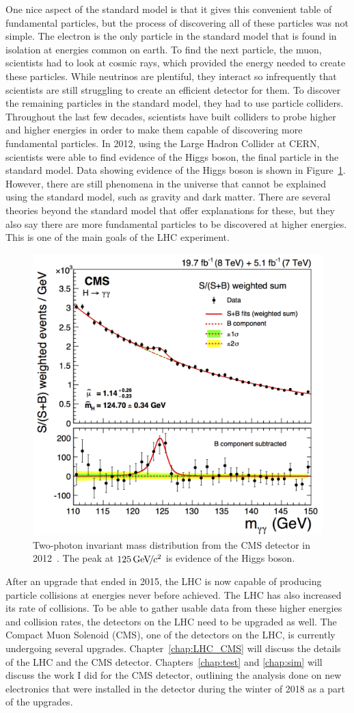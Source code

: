 One nice aspect of the standard model is that it gives this convenient table of fundamental particles, but the process of discovering all of these particles was not simple. The electron is the only particle in the standard model that is found in isolation at energies common on earth. To find the next particle, the muon, scientists had to look at cosmic rays, which provided the energy needed to create these particles. While neutrinos are plentiful, they interact so infrequently that scientists are still struggling to create an efficient detector for them. To discover the remaining particles in the standard model, they had to use particle colliders. Throughout the last few decades, scientists have built colliders to probe higher and higher energies in order to make them capable of discovering more fundamental particles. In 2012, using the Large Hadron Collider at CERN, scientists were able to find evidence of the Higgs boson, the final particle in the standard model. Data showing evidence of the Higgs boson is shown in Figure~\ref{fig:higgs}. However, there are still phenomena in the universe that cannot be explained using the standard model, such as gravity and dark matter. There are several theories beyond the standard model that offer explanations for these, but they also say there are more fundamental particles to be discovered at higher energies. This is one of the main goals of the LHC experiment. 

\begin{figure}
\centering
\includegraphics[width=0.6\linewidth]{Figures/higgsmeasurement.png}
\caption{Two-photon invariant mass distribution from the CMS detector in 2012~\cite{CMS_Higgs_Discovery}. The peak at $125{\,\text{Ge\hspace{-.08em}V\hspace{-0.16em}/\hspace{-0.08em}}c^\text{2}}$ is evidence of the Higgs boson.}
\label{fig:higgs}
\end{figure} 


After an upgrade that ended in 2015, the LHC is now capable of producing particle collisions at energies never before achieved. The LHC has also increased its rate of collisions. To be able to gather usable data from these higher energies and collision rates, the detectors on the LHC need to be upgraded as well. The Compact Muon Solenoid (CMS), one of the detectors on the LHC, is currently undergoing several upgrades. Chapter~\ref{chap:LHC_CMS} will discuss the details of the LHC and the CMS detector. Chapters~\ref{chap:test} and \ref{chap:sim} will discuss the work I did for the CMS detector, outlining the analysis done on new electronics that were installed in the detector during the winter of 2018 as a part of the upgrades.

